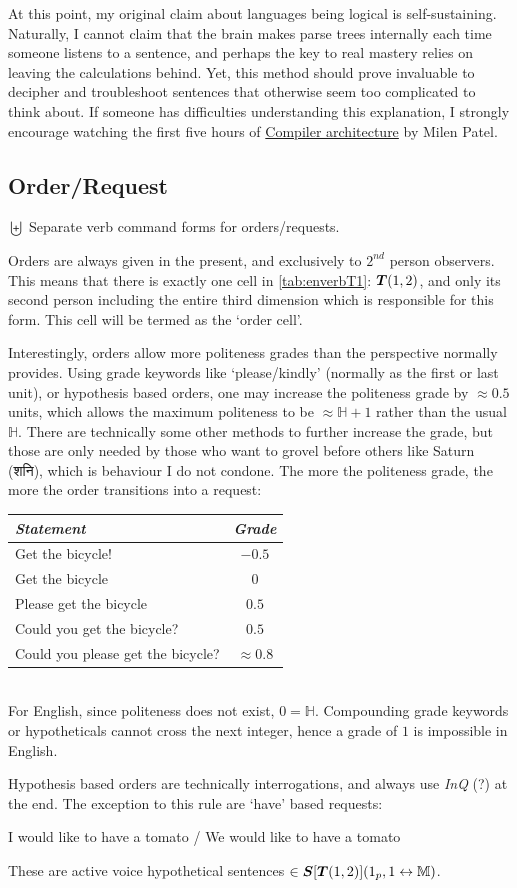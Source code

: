 At this point, my original claim about languages being logical is self-sustaining. Naturally, I cannot claim that the brain makes parse trees internally each time someone listens to a sentence, and perhaps the key to real mastery relies on leaving the calculations behind. Yet, this method should prove invaluable to decipher and troubleshoot sentences that otherwise seem too complicated to think about. If someone has difficulties understanding this explanation, I strongly encourage watching the first five hours of \href{https://www.youtube.com/watch?v=awsH0iq0O1A}{Compiler architecture} by Milen Patel.
\subsection{Order/Request}
$\biguplus$ Separate verb command forms for orders/requests.

Orders are always given in the present, and  exclusively to $2^{nd}$ person observers. This means that there is exactly one cell in \autoref{tab:enverbT1}: $\boldsymbol{T}(1,2)$, and only its second person including the entire third dimension which is responsible for this form. This cell will be termed as the `order cell'.

Interestingly, orders allow more politeness grades than the perspective normally provides. Using  grade keywords like `please/kindly' (normally as the first or last unit), or  hypothesis based orders, one may  increase the politeness grade by $\approx0.5$ units, which allows the maximum politeness to be $\approx\mathbb{H}+1$ rather than the usual $\mathbb{H}$. There are technically some other methods to further increase the grade, but those are only needed by those who want to grovel before others like Saturn (\textsanskrit{शनि}), which is behaviour I do not condone. The more the politeness grade, the more the order transitions into a request:
\begin{example}
    \begin{tabular}{m{7cm} c}
        \textit{Statement} & \textit{Grade}\\\hline
        Get the bicycle! & $-0.5$\\\hline
        Get the bicycle & $0$\\\hline
        Please get the bicycle & $0.5$\\\hline
        Could you get the bicycle? & $0.5$\\\hline
        Could you please get the bicycle? & $\approx0.8$\\\hline
    \end{tabular}
   \\  For English,  since politeness does not exist, $0=\mathbb{H}$. Compounding grade keywords or hypotheticals cannot cross the next integer, hence a grade of $1$ is impossible in English.
\end{example}
Hypothesis based orders are technically interrogations, and always use  \textit{InQ} (?) at the end. The exception to this rule are  `have' based requests: 
\begin{example}
I would like to have a tomato / We would like to have a tomato
\end{example}
These are  active voice hypothetical sentences $\in\boldsymbol{S}[\boldsymbol{T}(1,2)](1_p,1\leftrightarrow\mathbb{M})$.

